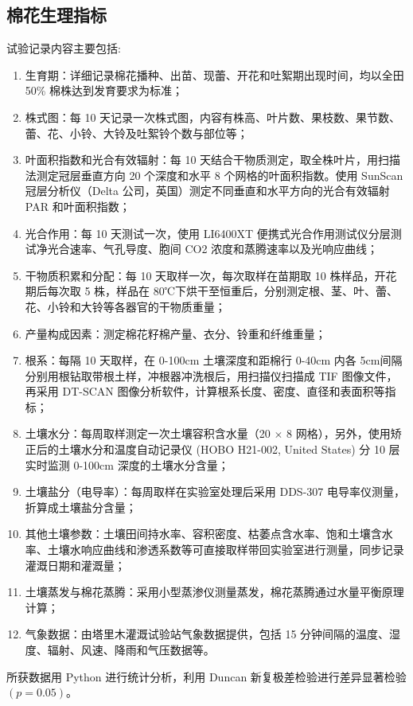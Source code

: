 \subsection{棉花生理指标}
试验记录内容主要包括:
\begin{enumerate}
    \item 生育期：详细记录棉花播种、出苗、现蕾、开花和吐絮期出现时间，均以全田 50\% 棉株达到发育要求为标准；
    \item 株式图：每 10 天记录一次株式图，内容有株高、叶片数、果枝数、果节数、蕾、花、小铃、大铃及吐絮铃个数与部位等；
    \item 叶面积指数和光合有效辐射：每 10 天结合干物质测定，取全株叶片，用扫描法测定冠层垂直方向 20 个深度和水平 8 个网格的叶面积指数。使用 SunScan冠层分析仪（Delta 公司，英国）测定不同垂直和水平方向的光合有效辐射 PAR 和叶面积指数；
    \item 光合作用：每 10 天测试一次，使用 LI6400XT 便携式光合作用测试仪分层测试净光合速率、气孔导度、胞间 CO2 浓度和蒸腾速率以及光响应曲线；
    \item 干物质积累和分配：每 10 天取样一次，每次取样在苗期取 10 株样品，开花期后每次取 5 株，样品在 80℃下烘干至恒重后，分别测定根、茎、叶、蕾、花、小铃和大铃等各器官的干物质重量；
    \item 产量构成因素：测定棉花籽棉产量、衣分、铃重和纤维重量；
    \item 根系：每隔 10 天取样，在 0-100cm 土壤深度和距棉行 0-40cm 内各 5cm间隔分别用根钻取带根土样，冲根器冲洗根后，用扫描仪扫描成 TIF 图像文件，再采用 DT-SCAN 图像分析软件，计算根系长度、密度、直径和表面积等指标；
    \item 土壤水分：每周取样测定一次土壤容积含水量（20 $\times$ 8 网格），另外，使用矫正后的土壤水分和温度自动记录仪 (HOBO H21-002, United States) 分 10 层实时监测 0-100cm 深度的土壤水分含量；
    \item 土壤盐分（电导率）：每周取样在实验室处理后采用 DDS-307 电导率仪测量，折算成土壤盐分含量；
    \item 其他土壤参数：土壤田间持水率、容积密度、枯萎点含水率、饱和土壤含水率、土壤水响应曲线和渗透系数等可直接取样带回实验室进行测量，同步记录灌溉日期和灌溉量；
    \item 土壤蒸发与棉花蒸腾：采用小型蒸渗仪测量蒸发，棉花蒸腾通过水量平衡原理计算；
    \item 气象数据：由塔里木灌溉试验站气象数据提供，包括 15 分钟间隔的温度、湿度、辐射、风速、降雨和气压数据等。
\end{enumerate}

所获数据用 Python 进行统计分析，利用 Duncan 新复极差检验进行差异显著检验 $(p = 0.05)$。

